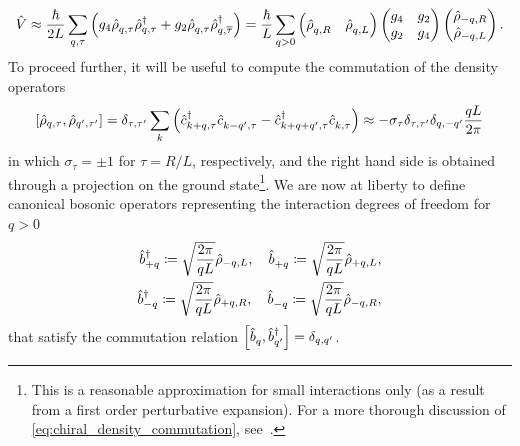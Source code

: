 \begin{align}
    \hat V \approx \frac{\hbar}{2L}\sum_{q,\tau}\brlr{g_4\hat\rho^\pdag_{q,\tau}\hat\rho^\dag_{q,\tau} + g_2\hat\rho^\pdag_{q,\tau}\hat\rho^\dag_{q,\overline\tau}}
    =
    \frac{\hbar}{L}\sum_{q>0}
    \begin{pmatrix}
        \hat\rho^\pdag_{q,R} & \hat\rho^\pdag_{q,L}
    \end{pmatrix}
    \begin{pmatrix}
        g_4 & g_2 \\
        g_2 & g_4
    \end{pmatrix}
    \begin{pmatrix}
        \hat\rho_{-q,R} \\ \hat\rho_{-q,L}
    \end{pmatrix}
    .
    \label{eq:interaction_densities}
\end{align}
To proceed further, it will be useful to compute the commutation of the density operators
\begin{align}
    \commutator{\hat\rho_{q,\tau},\hat\rho_{q',\tau'}}
    =
    \delta_{\tau,\tau'}\sum_k\brlr{\hat c^\dag_{k+q,\tau}\hat c^\pdag_{k-q',\tau}-\hat c^\dag_{k+q+q',\tau}\hat c^\pdag_{k,\tau}}
    \approx
    -\sigma_\tau\delta_{\tau,\tau'}\delta_{q,-q'}\frac{qL}{2\pi}
    \label{eq:chiral_density_commutation}
\end{align}
in which $\sigma_\tau=\pm1$ for $\tau=R/L$, respectively, and the right hand side is obtained through a projection on the ground state\footnote{This is a reasonable approximation for small interactions only (as a result from a first order perturbative expansion).
For a more thorough discussion of \cref{eq:chiral_density_commutation}, see~\cite{Giamarchi2003}.
}.
We are now at liberty to define canonical bosonic operators representing the interaction degrees of freedom for $q>0$
\begin{align}
    \hat b^\dag_{+q} \coloneqq \sqrt\frac{2\pi}{qL}\hat\rho_{-q,L},
    \quad
    \hat b^\pdag_{+q} \coloneqq \sqrt\frac{2\pi}{qL}\hat\rho_{+q,L},
    \\
    \hat b^\dag_{-q} \coloneqq \sqrt\frac{2\pi}{qL}\hat\rho_{+q,R},
    \quad
    \hat b^\pdag_{-q} \coloneqq \sqrt\frac{2\pi}{qL}\hat\rho_{-q,R},
    \label{eq:canonical_bosonic_operators}
\end{align}
that satisfy the commutation relation $\commutator{\hat b_q^\pdag,\hat b_{q'}^\dag} = \delta_{q,q'}$.
